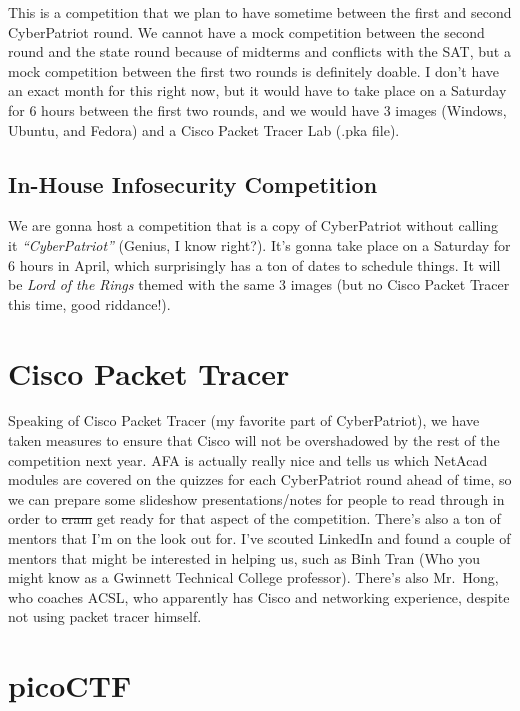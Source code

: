 \documentclass[
  letterpaper,
  DIV=11,
  numbers=noendperiod]{scrartcl}
\begin{document}
This is a competition that we plan to have sometime between the first
and second CyberPatriot round. We cannot have a mock competition between
the second round and the state round because of midterms and conflicts
with the SAT, but a mock competition between the first two rounds is
definitely doable. I don't have an exact month for this right now, but
it would have to take place on a Saturday for 6 hours between the first
two rounds, and we would have 3 images (Windows, Ubuntu, and Fedora) and
a Cisco Packet Tracer Lab (.pka file).

\hypertarget{in-house-infosecurity-competition}{%
\subsection{In-House Infosecurity
Competition}\label{in-house-infosecurity-competition}}

We are gonna host a competition that is a copy of CyberPatriot without
calling it \emph{``CyberPatriot''} (Genius, I know right?). It's gonna
take place on a Saturday for 6 hours in April, which surprisingly has a
ton of dates to schedule things. It will be \emph{Lord of the Rings}
themed with the same 3 images (but no Cisco Packet Tracer this time,
good riddance!).

\hypertarget{cisco-packet-tracer}{%
\section{Cisco Packet Tracer}\label{cisco-packet-tracer}}

Speaking of Cisco Packet Tracer (my favorite part of CyberPatriot), we
have taken measures to ensure that Cisco will not be overshadowed by the
rest of the competition next year. AFA is actually really nice and tells
us which NetAcad modules are covered on the quizzes for each
CyberPatriot round ahead of time, so we can prepare some slideshow
presentations/notes for people to read through in order to \st{cram} get
ready for that aspect of the competition. There's also a ton of mentors
that I'm on the look out for. I've scouted LinkedIn and found a couple
of mentors that might be interested in helping us, such as Binh Tran
(Who you might know as a Gwinnett Technical College professor). There's
also Mr.~Hong, who coaches ACSL, who apparently has Cisco and networking
experience, despite not using packet tracer himself.

\hypertarget{picoctf}{%
\section{picoCTF}\label{picoctf}}
\end{document}
